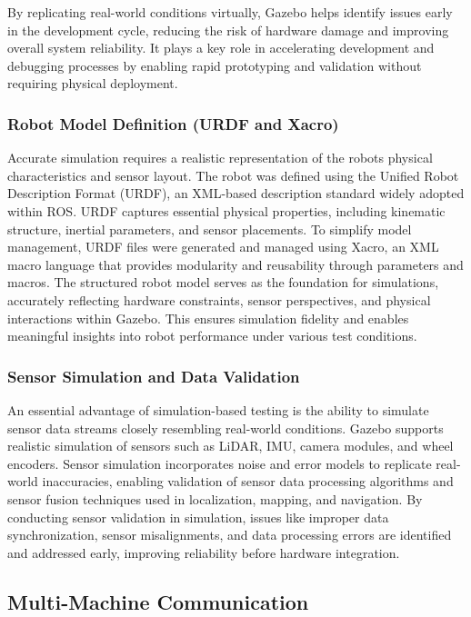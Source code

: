 \documentclass[english,project]{buwthesis}
\begin{document}
By replicating real-world conditions virtually, Gazebo helps identify issues early in the development cycle, reducing the risk of hardware damage and improving overall system reliability. It plays a key role in accelerating development and debugging processes by enabling rapid prototyping and validation without requiring physical deployment.

\subsubsection{Robot Model Definition (URDF and Xacro)}
Accurate simulation requires a realistic representation of the robot\textquotesingle s physical characteristics and sensor layout. The robot was defined using the Unified Robot Description Format (URDF), an XML-based description standard widely adopted within ROS. URDF captures essential physical properties, including kinematic structure, inertial parameters, and sensor placements. To simplify model management, URDF files were generated and managed using Xacro, an XML macro language that provides modularity and reusability through parameters and macros. The structured robot model serves as the foundation for simulations, accurately reflecting hardware constraints, sensor perspectives, and physical interactions within Gazebo. This ensures simulation fidelity and enables meaningful insights into robot performance under various test conditions.
\subsubsection{Sensor Simulation and Data Validation}
An essential advantage of simulation-based testing is the ability to simulate sensor data streams closely resembling real-world conditions. Gazebo supports realistic simulation of sensors such as LiDAR, IMU, camera modules, and wheel encoders. Sensor simulation incorporates noise and error models to replicate real-world inaccuracies, enabling validation of sensor data processing algorithms and sensor fusion techniques used in localization, mapping, and navigation. By conducting sensor validation in simulation, issues like improper data synchronization, sensor misalignments, and data processing errors are identified and addressed early, improving reliability before hardware integration.
\subsection{Multi-Machine Communication}
\end{document}
